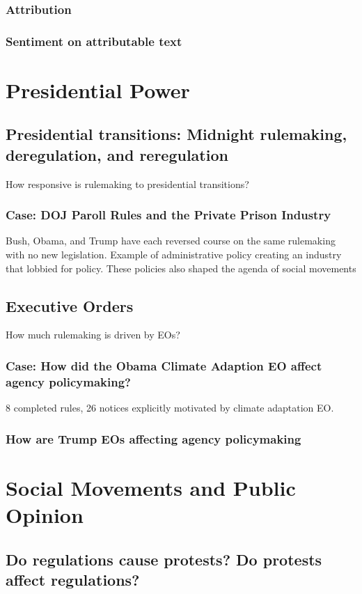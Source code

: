 \subsubsection{Attribution}
\subsubsection{Sentiment on attributable text}

\section{Presidential Power}

\subsection{Presidential transitions: Midnight rulemaking, deregulation, and reregulation}
How responsive is rulemaking to presidential transitions?
\subsubsection{Case: DOJ Paroll Rules and the Private Prison Industry}
Bush, Obama, and Trump have each reversed course on the same rulemaking with no new legislation. Example of administrative policy creating an industry that lobbied for policy. These policies also shaped the agenda of social movements
\subsection{Executive Orders}
How much rulemaking is driven by EOs? 
\subsubsection{Case: How did the Obama Climate Adaption EO affect agency policymaking?}
8 completed rules, 26 notices explicitly motivated by climate adaptation EO.
\subsubsection{How are Trump EOs affecting agency policymaking}

\section{Social Movements and Public Opinion}

\subsection{Do regulations cause protests? Do protests affect regulations?}

